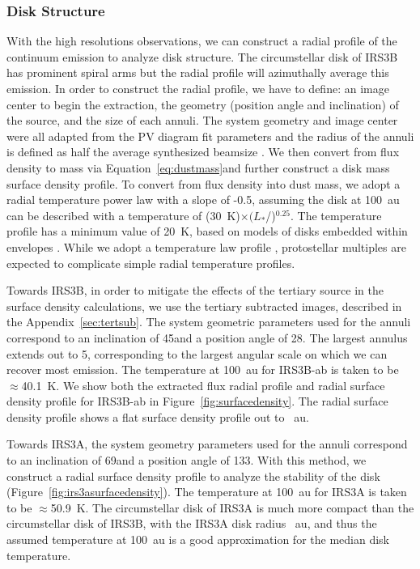 \documentclass[twocolumn, 12pt, trackchanges]{aastex63}
\begin{document}
\subsubsection{Disk Structure}\label{sec:struct}
With the high resolutions observations, we can construct a radial profile of the continuum emission to analyze disk structure. The circumstellar disk of IRS3B has prominent spiral arms but the radial profile will azimuthally average this emission. In order to construct the radial profile, we have to define: an image center to begin the extraction, the geometry (position angle and inclination) of the source, and the size of each annuli. The system geometry and image center were all adapted from the PV diagram fit parameters and the radius of the annuli is defined as half the average synthesized beamsize \citep[Nyquist Sampling;][]{1928TAIEE..47..617N}. We then convert from flux density to mass via Equation~\ref{eq:dustmass}\space and further construct a disk mass surface density profile. To convert from flux density into dust mass, we adopt a radial temperature power law with a slope of -0.5, assuming the disk at 100~au can be described with a temperature of (30~K)$\times(L_{*}$/\lsun)$^{0.25}$. The temperature profile has a minimum value of 20~K, based on models of disks embedded within envelopes \citep[][]{2003ApJ...591.1049W}. While we adopt a temperature law profile , protostellar multiples are expected to complicate simple radial temperature profiles.

Towards IRS3B, in order to mitigate the effects of the tertiary source in the surface density calculations, we use the tertiary subtracted images, described in the Appendix~\ref{sec:tertsub}. The system geometric parameters used for the annuli correspond to an inclination of 45\deg\space and a position angle of 28\deg{}. The largest annulus extends out to 5\arcsec, corresponding to the largest angular scale on which we can recover most emission. The temperature at 100~au for IRS3B-ab is taken to be $\approx$40.1~K. We show both the extracted flux radial profile and radial surface density profile for IRS3B-ab in Figure~\ref{fig:surfacedensity}. The radial surface density profile shows a flat surface density profile out to ~au.

Towards IRS3A, the system geometry parameters used for the annuli correspond to an inclination of 69\deg\space and a position angle of 133\deg. With this method, we construct a radial surface density profile to analyze the stability of the disk (Figure~\ref{fig:irs3asurfacedensity}). The temperature at 100~au for IRS3A is taken to be $\approx$50.9~K. The circumstellar disk of IRS3A is much more compact than the circumstellar disk of IRS3B, with the IRS3A disk radius ~au, and thus the assumed temperature at 100~au is a good approximation for the median disk temperature.
\end{document}
